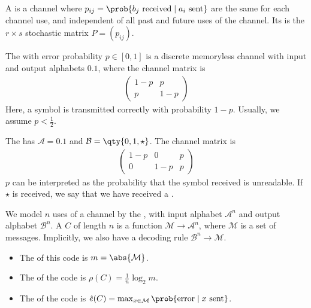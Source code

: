 \begin{definition}
    A  is a channel where $p_{ij} = \prob{b_j \text{ received} \mid a_i \text{ sent}}$ are the same for each channel use, and independent of all past and future uses of the channel.
    Its  is the $r \times s$ stochastic matrix $P = (p_{ij})$.
\end{definition}

\begin{example}
    The  with error probability $p \in [0,1]$ is a discrete memoryless channel with input and output alphabets $\qty{0, 1}$, where the channel matrix is
    \begin{align*}
        \begin{pmatrix}
            1-p & p \\
            p & 1-p
    \end{pmatrix}
    \end{align*}
    Here, a symbol is transmitted correctly with probability $1 - p$.
    Usually, we assume $p < \frac{1}{2}$.
\end{example}

\begin{example}
    The  has $\mathcal A = \qty{0, 1}$ and $\mathcal B = \qty{0, 1, \star}$.
    The channel matrix is
    \begin{align*}
        \begin{pmatrix}
        1-p & 0 & p \\
        0 & 1-p & p
    \end{pmatrix}
    \end{align*}
    $p$ can be interpreted as the probability that the symbol received is unreadable.
    If $\star$ is received, we say that we have received a .
\end{example}

\begin{definition}
    We model $n$ uses of a channel by the , with input alphabet $\mathcal A^n$ and output alphabet $\mathcal B^n$.
    A  $C$ of length $n$ is a function $\mathcal M \to \mathcal A^n$, where $\mathcal M$ is a set of messages.
    Implicitly, we also have a decoding rule $\mathcal B^n \to \mathcal M$.
    \begin{itemize}
        \item The  of this code is $m = \abs{\mathcal M}$.
        \item The  of the code is $\rho(C) = \frac{1}{n} \log_2 m$.
        \item The  of the code is $\hat e(C) = \max_{x \in \mathcal M} \prob{\text{error} \mid x \text{ sent}}$.
    \end{itemize}
\end{definition}

